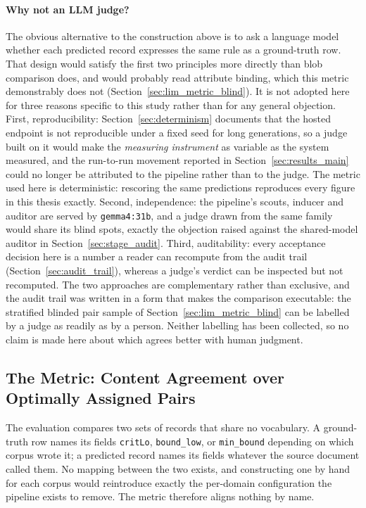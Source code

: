 \documentclass[11pt]{article}
\begin{document}
\paragraph{Why not an LLM judge?}
The obvious alternative to the construction above is to ask a language model
whether each predicted record expresses the same rule as a ground-truth row.
That design would satisfy the first two principles more directly than blob
comparison does, and would probably read attribute binding, which this metric
demonstrably does not (Section~\ref{sec:lim_metric_blind}). It is not adopted
here for three reasons specific to this study rather than for any general
objection. First, reproducibility: Section~\ref{sec:determinism} documents that
the hosted endpoint is not reproducible under a fixed seed for long generations,
so a judge built on it would make the \emph{measuring instrument} as variable as
the system measured, and the run-to-run movement reported in
Section~\ref{sec:results_main} could no longer be attributed to the pipeline
rather than to the judge.
The metric used here is deterministic: rescoring the same predictions reproduces
every figure in this thesis exactly. Second, independence: the pipeline's scouts,
inducer and auditor are served by \texttt{gemma4:31b}, and a judge drawn from the
same family would share its blind spots, exactly the objection raised against
the shared-model auditor in Section~\ref{sec:stage_audit}. Third, auditability:
every acceptance decision here is a number a reader can recompute from the audit
trail (Section~\ref{sec:audit_trail}), whereas a judge's verdict can be
inspected but not recomputed. The two approaches are complementary rather than
exclusive, and the audit trail was written in a form that makes the comparison
executable: the stratified blinded pair sample of
Section~\ref{sec:lim_metric_blind} can be labelled by a judge as readily as by a
person. Neither labelling has been collected, so no claim is made here about
which agrees better with human judgment.

\subsection{The Metric: Content Agreement over Optimally Assigned Pairs}
\label{sec:metrics}

The evaluation compares two sets of records that share no vocabulary. A
ground-truth row names its fields \texttt{critLo}, \texttt{bound\_low}, or
\texttt{min\_bound} depending on which corpus wrote it; a predicted record names
its fields whatever the source document called them. No mapping between the two
exists, and constructing one by hand for each corpus would reintroduce exactly
the per-domain configuration the pipeline exists to remove. The metric therefore
aligns nothing by name.
\end{document}
